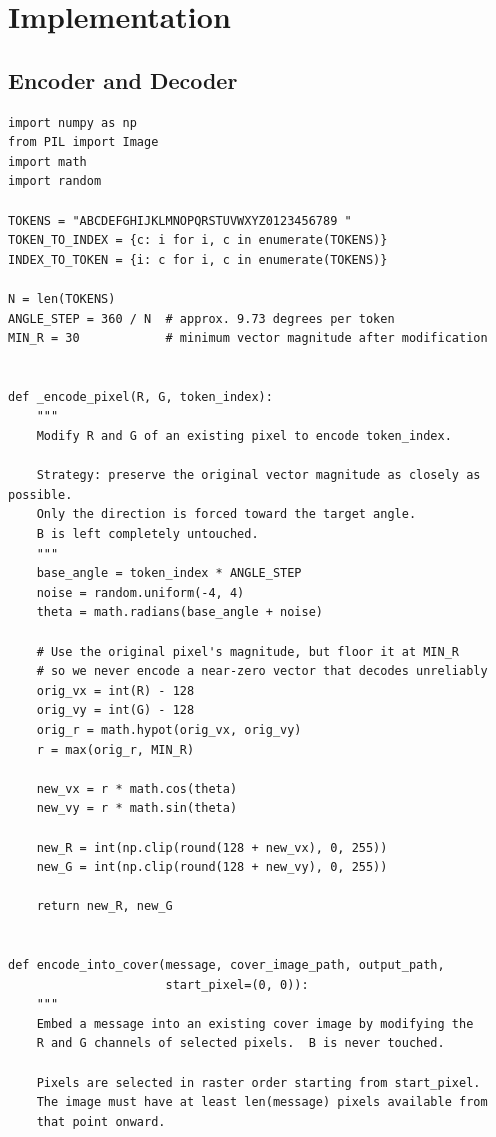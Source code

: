 \documentclass[12pt]{article}
\begin{document}
\section{Implementation}
\label{sec:impl}

\subsection{Encoder and Decoder}

\begin{lstlisting}[caption={Cover-image encoder and decoder
(\texttt{method.py})}, label={lst:cover}]
import numpy as np
from PIL import Image
import math
import random

TOKENS = "ABCDEFGHIJKLMNOPQRSTUVWXYZ0123456789 "
TOKEN_TO_INDEX = {c: i for i, c in enumerate(TOKENS)}
INDEX_TO_TOKEN = {i: c for i, c in enumerate(TOKENS)}

N = len(TOKENS)
ANGLE_STEP = 360 / N  # approx. 9.73 degrees per token
MIN_R = 30            # minimum vector magnitude after modification


def _encode_pixel(R, G, token_index):
    """
    Modify R and G of an existing pixel to encode token_index.

    Strategy: preserve the original vector magnitude as closely as possible.
    Only the direction is forced toward the target angle.
    B is left completely untouched.
    """
    base_angle = token_index * ANGLE_STEP
    noise = random.uniform(-4, 4)
    theta = math.radians(base_angle + noise)

    # Use the original pixel's magnitude, but floor it at MIN_R
    # so we never encode a near-zero vector that decodes unreliably
    orig_vx = int(R) - 128
    orig_vy = int(G) - 128
    orig_r = math.hypot(orig_vx, orig_vy)
    r = max(orig_r, MIN_R)

    new_vx = r * math.cos(theta)
    new_vy = r * math.sin(theta)

    new_R = int(np.clip(round(128 + new_vx), 0, 255))
    new_G = int(np.clip(round(128 + new_vy), 0, 255))

    return new_R, new_G


def encode_into_cover(message, cover_image_path, output_path,
                      start_pixel=(0, 0)):
    """
    Embed a message into an existing cover image by modifying the
    R and G channels of selected pixels.  B is never touched.

    Pixels are selected in raster order starting from start_pixel.
    The image must have at least len(message) pixels available from
    that point onward.


\end{lstlisting}
\end{document}
